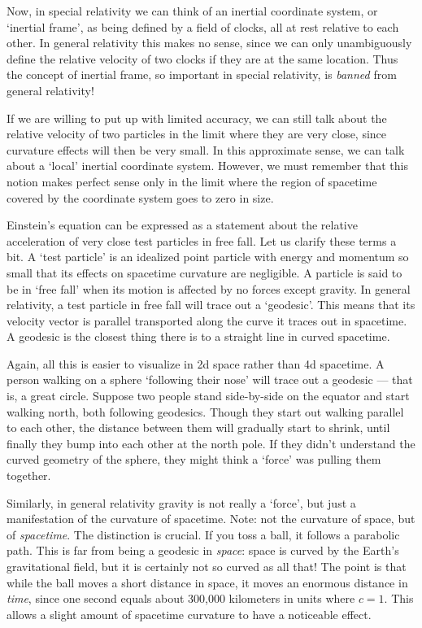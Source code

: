 Now, in special relativity we can think of an inertial coordinate
system, or `inertial frame', as being defined by a field of 
clocks, all at rest relative to each other.   In general relativity
this makes no sense, since we can only unambiguously define the 
relative velocity of two clocks if they are at the same location.  
Thus the concept of inertial frame, so important in special relativity,
is {\it banned} from general relativity!   

If we are willing to put up with limited accuracy, we can still talk
about the relative velocity of two particles in the limit where they are
very close, since curvature effects will then be very small.   In
this approximate sense, we can talk about a  `local' inertial coordinate
system.  However, we must remember that this notion makes
perfect sense only in the limit where the region of spacetime covered by the
coordinate system goes to zero in size.  

Einstein's equation can be expressed as a statement about the relative
acceleration of very close test particles in free fall.  Let us clarify
these terms a bit.  A `test particle' is an idealized point particle
with energy and momentum so small that its effects on spacetime curvature
are negligible.  A particle is said to be in `free fall' when its motion
is affected by no forces except gravity.  In general relativity, a test
particle in free fall will trace out a `geodesic'.  This means that its
velocity vector is parallel transported along the curve it traces out
in spacetime.  A geodesic is the closest thing there is to a straight line 
in curved spacetime.  

Again, all this is easier to visualize in 2d space rather than 4d
spacetime.  A person walking on a sphere `following their nose' will
trace out a geodesic --- that is, a great circle.  Suppose two people
stand side-by-side on the equator and start walking north, both
following geodesics.  Though they start out walking parallel to each
other, the distance between them will gradually start to shrink, until
finally they bump into each other at the north pole.  If they didn't
understand the curved geometry of the sphere, they might think a `force'
was pulling them together.  

Similarly, in general relativity gravity is not really a `force', but
just a manifestation of the curvature of spacetime.  Note: not the
curvature of space, but of {\it spacetime}.  The distinction is
crucial.  If you toss a ball, it follows a parabolic path.  This is far from
being a geodesic in {\it space}: space is curved by the Earth's
gravitational field, but it is certainly not so curved as all that!  The
point is that while the ball moves a short distance in space, it moves
an enormous distance in {\it time}, since one second equals about
300,000 kilometers in units where $c = 1$.  This allows a slight amount
of spacetime curvature to have a noticeable effect.

